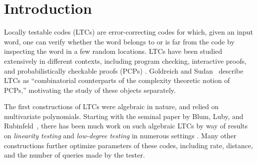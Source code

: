 \documentclass{toc}
\theoremstyle{plain}
\begin{document}
\begin{frontmatter}
\begin{abstract}
Our proof technique deviates significantly from that of Polishchuk and Spielman, which relies on algebraic methods such as B\'{e}zout's Theorem, and instead leverages a fundamental result in extremal graph theory by
%
K\H{o}v\'{a}ri,    %
S\'{o}s, and Tur\'{a}n. To our knowledge, this is the first time this result is used in the context of low-degree testing.

\smallskip
\emph{(2) Improved robustness for tensor product codes.}
Robustness is a strengthening of local testability that underlies many applications. We prove that the axis-parallel hyperplane test for the
%
$m$-th tensor power                                                                 %
of a linear code with block length $\blocklength$ and distance $\codedist$ is $\Omega({\codedist^m}/{\blocklength^m})$-robust. This improves on a theorem of Viderman (2012) by a factor of $1/\poly(m)$. While the improvement is not large, we believe that our proof is a notable simplification compared to prior work.
\end{abstract}

%

\end{frontmatter}

\section{Introduction}\label{sec:intro}
%


Locally testable codes (LTCs) are error-correcting codes for which, given an input word, one can verify whether the word belongs to or is far from the code by inspecting the word in a few random locations.
LTCs have been studied extensively in different contexts, including program checking, interactive proofs, and probabilistically checkable proofs (PCPs) \cite{BlumLR93,RubinfeldS96,BabaiFL91,BabaiFLS91,PolishchukS94, GoldreichS06}. Goldreich and Sudan~\cite{GoldreichS06} describe LTCs as ``combinatorial counterparts of the complexity theoretic notion of PCPs,'' motivating the study of these objects separately.

The first constructions of LTCs were algebraic in nature, and relied on multivariate polynomials. Starting with the seminal
%
paper by  %
Blum, Luby, and Rubinfeld~\cite{BlumLR93}, there has been much work on such algebraic LTCs by way of results on \emph{linearity testing} and \emph{low-degree testing} in numerous settings \cite{BlumLR93,BenOrCLR08,BenSassonSVW03,BellareCHKS96,AlonKKLR05,BhattacharyyaKSSZ10}. Many other constructions \cite{Meir09, Viderman13, KoppartyMRS16} further optimize parameters of these codes,
including rate, distance, and the number of queries made by the tester.
\end{document}
